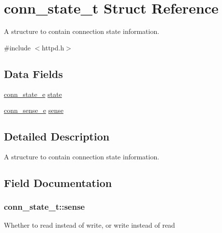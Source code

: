 \hypertarget{structconn__state__t}{}\section{conn\+\_\+state\+\_\+t Struct Reference}
\label{structconn__state__t}


A structure to contain connection state information.  




{\ttfamily \#include $<$httpd.\+h$>$}

\subsection*{Data Fields}
\begin{DoxyCompactItemize}
\item 
\hyperlink{group__APACHE__CORE__DAEMON_ga60b752d9a3496ccdcf3c877bd2819d04}{conn\+\_\+state\+\_\+e} \hyperlink{structconn__state__t_a36f60000f8a31c0088dfdbf4f8ba272c}{state}
\item 
\hyperlink{group__APACHE__CORE__DAEMON_gaae1efcb45706e72ff21b849a79ffbd58}{conn\+\_\+sense\+\_\+e} \hyperlink{structconn__state__t_ac4c63ee776308f35af33715ecd20ce93}{sense}
\end{DoxyCompactItemize}


\subsection{Detailed Description}
A structure to contain connection state information. 

\subsection{Field Documentation}
\subsubsection[{\texorpdfstring{sense}{sense}}]{ conn\+\_\+state\+\_\+t\+::sense}\hypertarget{structconn__state__t_ac4c63ee776308f35af33715ecd20ce93}{}\label{structconn__state__t_ac4c63ee776308f35af33715ecd20ce93}
Whether to read instead of write, or write instead of read 
